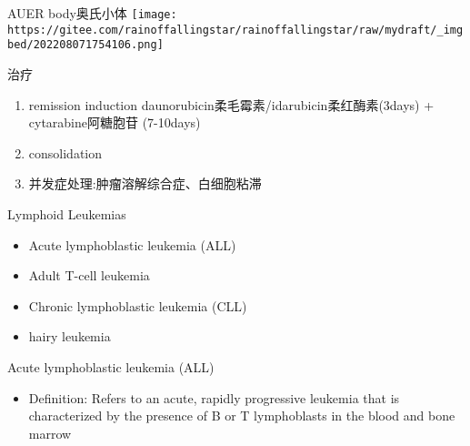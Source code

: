 \documentclass[
  ignorenonframetext,
]{beamer}
\providecommand{\tightlist}{%
  \setlength{\itemsep}{0pt}\setlength{\parskip}{0pt}}
\begin{document}
\begin{frame}
\begin{block}{AUER body奥氏小体}
\protect\hypertarget{auer-bodyux5965ux6c0fux5c0fux4f53}{}
\texttt{[image: https://gitee.com/rainoffallingstar/rainoffallingstar/raw/mydraft/\_imgbed/202208071754106.png]}
\end{block}
\end{frame}

\begin{frame}
\begin{block}{治疗}
\protect\hypertarget{ux6cbbux7597-6}{}
\begin{enumerate}
\item
  remission induction daunorubicin柔毛霉素/idarubicin柔红酶素(3days) +
  cytarabine阿糖胞苷 (7-10days)
\item
  consolidation
\item
  并发症处理:肿瘤溶解综合症、白细胞粘滞
\end{enumerate}
\end{block}
\end{frame}

\begin{frame}
\begin{block}{Lymphoid Leukemias}
\protect\hypertarget{lymphoid-leukemias}{}
\begin{itemize}
\item
  Acute lymphoblastic leukemia (ALL)
\item
  Adult T-cell leukemia
\item
  Chronic lymphoblastic leukemia (CLL)
\item
  hairy leukemia
\end{itemize}
\end{block}
\end{frame}

\begin{frame}
\begin{block}{Acute lymphoblastic leukemia (ALL)}
\protect\hypertarget{acute-lymphoblastic-leukemia-all}{}
\begin{itemize}
\tightlist
\item
  Definition: Refers to an acute, rapidly progressive leukemia that is
  characterized by the presence of B or T lymphoblasts in the blood and
  bone marrow
\end{itemize}
\end{block}
\end{frame}
\end{document}
